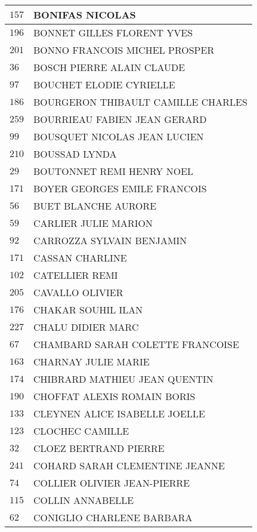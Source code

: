 \begin{xltabular}{\linewidth}{|l|X|}
    $157$ & BONIFAS NICOLAS \\
    \hline
    $196$ & BONNET GILLES FLORENT YVES \\
    \hline
    $201$ & BONNO FRANCOIS MICHEL PROSPER \\
    \hline
    $36$ & BOSCH PIERRE ALAIN CLAUDE \\
    \hline
    $97$ & BOUCHET ELODIE CYRIELLE \\
    \hline
    $186$ & BOURGERON THIBAULT CAMILLE CHARLES \\
    \hline
    $259$ & BOURRIEAU FABIEN JEAN GERARD \\
    \hline
    $99$ & BOUSQUET NICOLAS JEAN LUCIEN \\
    \hline
    $210$ & BOUSSAD LYNDA \\
    \hline
    $29$ & BOUTONNET REMI HENRY NOEL \\
    \hline
    $171$ & BOYER GEORGES EMILE FRANCOIS \\
    \hline
    $56$ & BUET BLANCHE AURORE \\
    \hline
    $59$ & CARLIER JULIE MARION \\
    \hline
    $92$ & CARROZZA SYLVAIN BENJAMIN \\
    \hline
    $171$ & CASSAN CHARLINE \\
    \hline
    $102$ & CATELLIER REMI \\
    \hline
    $205$ & CAVALLO OLIVIER \\
    \hline
    $176$ & CHAKAR SOUHIL ILAN \\
    \hline
    $227$ & CHALU DIDIER MARC \\
    \hline
    $67$ & CHAMBARD SARAH COLETTE FRANCOISE \\
    \hline
    $163$ & CHARNAY JULIE MARIE \\
    \hline
    $174$ & CHIBRARD MATHIEU JEAN QUENTIN \\
    \hline
    $190$ & CHOFFAT ALEXIS ROMAIN BORIS \\
    \hline
    $133$ & CLEYNEN ALICE ISABELLE JOELLE \\
    \hline
    $123$ & CLOCHEC CAMILLE \\
    \hline
    $32$ & CLOEZ BERTRAND PIERRE \\
    \hline
    $241$ & COHARD SARAH CLEMENTINE JEANNE \\
    \hline
    $74$ & COLLIER OLIVIER JEAN-PIERRE \\
    \hline
    $115$ & COLLIN ANNABELLE \\
    \hline
    $62$ & CONIGLIO CHARLENE BARBARA \\

\end{xltabular}
